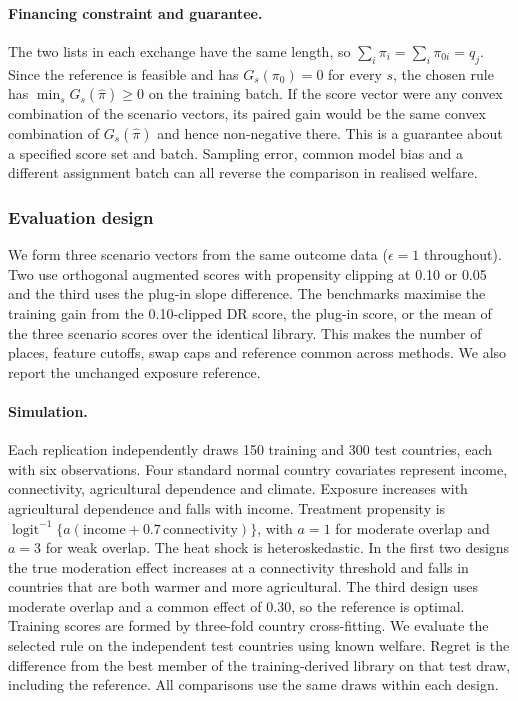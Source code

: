 \paragraph{Financing constraint and guarantee.}
The two lists in each exchange have the same length, so
$\sum_i\pi_i=\sum_i\pi_{0i}=q_j$. Since the reference is feasible and has
$G_s(\pi_0)=0$ for every $s$, the chosen rule has $\min_s G_s(\hat\pi)\geq 0$
on the training batch. If the score vector were any convex combination of the
scenario vectors, its paired gain would be the same convex combination of
$G_s(\hat\pi)$ and hence non-negative there. This is a guarantee about a specified
score set and batch. Sampling error, common model bias and a different
assignment batch can all reverse the comparison in realised welfare.

\subsubsection{Evaluation design}

We form three scenario vectors from the same outcome data
($\epsilon=1$ throughout). Two use orthogonal augmented scores with propensity
clipping at 0.10 or 0.05 and the third uses the plug-in slope difference. The
benchmarks maximise the training gain from the 0.10-clipped DR score, the plug-in
score, or the mean of the three scenario scores over the identical library. This makes the number of places,
feature cutoffs, swap caps and reference common across methods. We also report
the unchanged exposure reference.

\paragraph{Simulation.}
Each replication independently draws 150 training and 300 test countries, each
with six observations. Four standard normal country covariates represent income,
connectivity, agricultural dependence and climate. Exposure increases with
agricultural dependence and falls with income. Treatment propensity is
$\operatorname{logit}^{-1}\{a(\mathrm{income}+0.7\,\mathrm{connectivity})\}$,
with $a=1$ for moderate overlap and $a=3$ for weak overlap. The heat shock is
heteroskedastic. In the first two designs the true moderation effect increases
at a connectivity threshold and falls in countries that are both warmer and
more agricultural. The third design uses moderate overlap and a common effect
of 0.30, so the reference is optimal. Training scores are formed by three-fold
country cross-fitting. We evaluate the selected rule on the independent test
countries using known welfare. Regret is the difference from the best member
of the training-derived library on that test draw, including the reference.
All comparisons use the same draws within each design.

